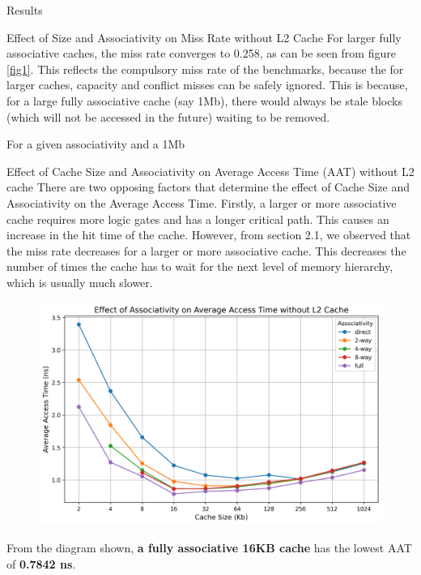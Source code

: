 \begin{section}{Results}
\begin{subsection}{Effect of Size and Associativity on Miss Rate without L2 Cache}
    For larger fully associative caches, the miss rate converges to 0.258, as can be seen from figure \ref{fig1}. This reflects the compulsory miss rate  of the benchmarks, because the for larger caches, capacity and conflict misses can be safely ignored. This is because, for a large fully associative cache (say 1Mb), there would always be stale blocks (which will not be accessed in the future) waiting to be removed. 

    For a given associativity and a 1Mb 


    \end{subsection}

    \newpage

    \begin{subsection}{Effect of Cache Size and Associativity on Average Access Time (AAT) without L2 cache }
        There are two opposing factors that determine the effect of Cache Size and Associativity on the Average Access Time. Firstly, a larger or more associative cache requires more logic gates and has a longer critical path. This causes an increase in the hit time of the cache. However, from section 2.1, we observed that the miss rate decreases for a larger or more associative cache. This decreases the number of times the cache has to wait for the next level of memory hierarchy, which is usually much slower.

        \begin{figure}[h]
            \includegraphics[width=\textwidth]{figures/fig2/fig2.png}
            \centering
            \label{fig:fig2}
        \end{figure}

        From the diagram shown, \textbf{a fully associative 16KB cache} has the lowest AAT of \textbf{0.7842 ns}.
    \end{subsection}


\end{section}
